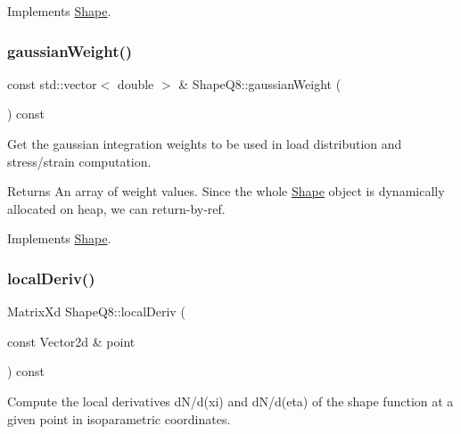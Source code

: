Implements \mbox{\hyperlink{class_shape_afa8029d0991fc5d9054a667823224bd0}{Shape}}.

\mbox{\label{class_shape_q8_a30891417d7ba6d6457b8b5567add07f5}} 
\subsubsection{\texorpdfstring{gaussian\+Weight()}{gaussianWeight()}}
{\footnotesize\ttfamily const std\+::vector$<$ double $>$ \& Shape\+Q8\+::gaussian\+Weight (\begin{DoxyParamCaption}{ }\end{DoxyParamCaption}) const\hspace{0.3cm}{\ttfamily [virtual]}}



Get the gaussian integration weights to be used in load distribution and stress/strain computation. 

\begin{DoxyReturn}{Returns}
An array of weight values. Since the whole \mbox{\hyperlink{class_shape}{Shape}} object is dynamically allocated on heap, we can return-\/by-\/ref. 
\end{DoxyReturn}


Implements \mbox{\hyperlink{class_shape_a4257697bb443af2871a7cc7a82c8c823}{Shape}}.

\mbox{\label{class_shape_q8_ac62182e6804216500c2b290efd5fd06a}} 
\subsubsection{\texorpdfstring{local\+Deriv()}{localDeriv()}}
{\footnotesize\ttfamily Matrix\+Xd Shape\+Q8\+::local\+Deriv (\begin{DoxyParamCaption}\item[{const Vector2d \&}]{point }\end{DoxyParamCaption}) const\hspace{0.3cm}{\ttfamily [virtual]}}



Compute the local derivatives d\+N/d(xi) and d\+N/d(eta) of the shape function at a given point in isoparametric coordinates. 

